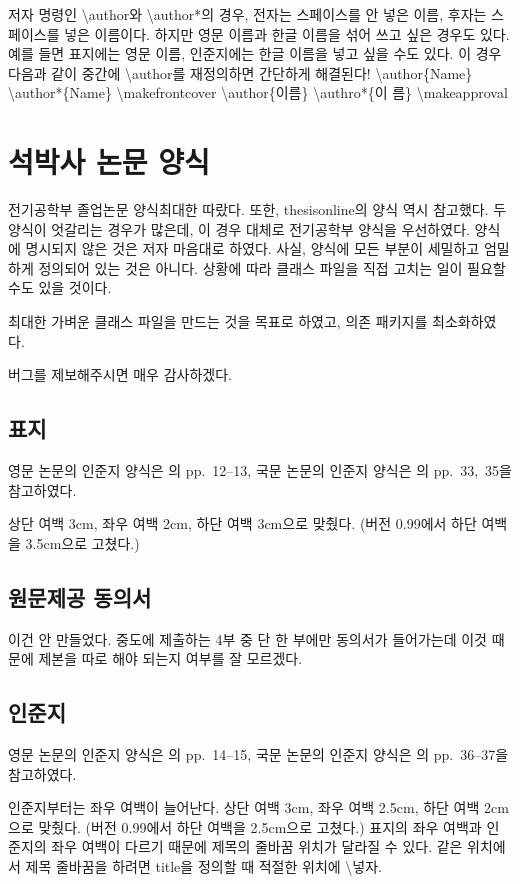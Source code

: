 \documentclass[a4paper]{report}
\begin{document}
저자 명령인 \textbackslash author와 \textbackslash author*의 경우,
전자는 스페이스를 안 넣은 이름, 후자는 스페이스를 넣은 이름이다.
하지만 영문 이름과 한글 이름을 섞어 쓰고 싶은 경우도 있다.
예를 들면 표지에는 영문 이름, 인준지에는 한글 이름을 넣고
싶을 수도 있다.
이 경우 다음과 같이 중간에 \textbackslash author를 재정의하면 간단하게
해결된다!
\textbackslash author\{Name\} \textbackslash author*\{Name\}
\textbackslash makefrontcover
\textbackslash author\{이름\} \textbackslash authro*\{이 름\}
\textbackslash makeapproval

\chapter{석박사 논문 양식}

전기공학부 졸업논문 양식\cite{under,grad}\을 최대한 따랐다.
또한, thesisonline의 양식 역시 참고했다.
두 양식이 엇갈리는 경우가 많은데,
이 경우 대체로 전기공학부 양식을 우선하였다.
양식에 명시되지 않은 것은 저자 마음대로 하였다.
사실, 양식에 모든 부분이 세밀하고 엄밀하게
정의되어 있는 것은 아니다.
상황에 따라 클래스 파일을 직접 고치는 일이
필요할 수도 있을 것이다.

최대한 가벼운 클래스 파일을 만드는 것을
목표로 하였고, 의존 패키지를 최소화하였다.

버그를 제보해주시면 매우 감사하겠다.

\section{표지}
영문 논문의 인준지 양식은 \cite{grad}의 pp.~12--13,
국문 논문의 인준지 양식은 \cite{grad}의 pp.~33,~35을 참고하였다.

상단 여백 3cm, 좌우 여백 2cm, 하단 여백 3cm으로 맞췄다.
(버전 0.99에서 하단 여백을 3.5cm으로 고쳤다.)

\section{원문제공 동의서}
이건 안 만들었다. 중도에 제출하는 4부 중 단 한 부에만
동의서가 들어가는데 이것 때문에 제본을 따로 해야
되는지 여부를 잘 모르겠다.

\section{인준지}
영문 논문의 인준지 양식은 \cite{grad}의 pp.~14--15,
국문 논문의 인준지 양식은 \cite{grad}의 pp.~36--37을 참고하였다.

인준지부터는 좌우 여백이 늘어난다.
상단 여백 3cm, 좌우 여백 2.5cm, 하단 여백 2cm으로 맞췄다.
(버전 0.99에서 하단 여백을 2.5cm으로 고쳤다.)
표지의 좌우 여백과 인준지의 좌우 여백이 다르기 때문에
제목의 줄바꿈 위치가 달라질 수 있다.
같은 위치에서 제목 줄바꿈을 하려면 title을 정의할 때
적절한 위치에 \textbackslash{} 넣자.
\end{document}
